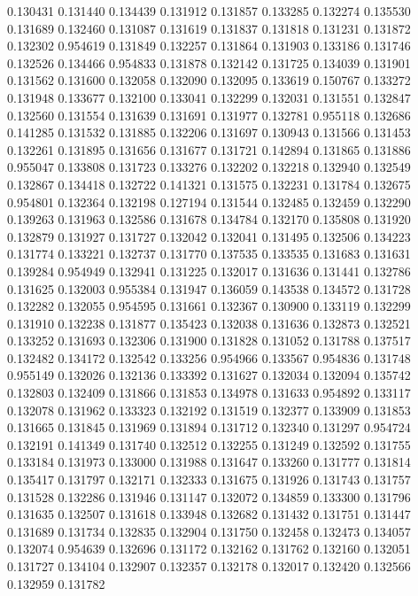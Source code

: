 0.130431
0.131440
0.134439
0.131912
0.131857
0.133285
0.132274
0.135530
0.131689
0.132460
0.131087
0.131619
0.131837
0.131818
0.131231
0.131872
0.132302
0.954619
0.131849
0.132257
0.131864
0.131903
0.133186
0.131746
0.132526
0.134466
0.954833
0.131878
0.132142
0.131725
0.134039
0.131901
0.131562
0.131600
0.132058
0.132090
0.132095
0.133619
0.150767
0.133272
0.131948
0.133677
0.132100
0.133041
0.132299
0.132031
0.131551
0.132847
0.132560
0.131554
0.131639
0.131691
0.131977
0.132781
0.955118
0.132686
0.141285
0.131532
0.131885
0.132206
0.131697
0.130943
0.131566
0.131453
0.132261
0.131895
0.131656
0.131677
0.131721
0.142894
0.131865
0.131886
0.955047
0.133808
0.131723
0.133276
0.132202
0.132218
0.132940
0.132549
0.132867
0.134418
0.132722
0.141321
0.131575
0.132231
0.131784
0.132675
0.954801
0.132364
0.132198
0.127194
0.131544
0.132485
0.132459
0.132290
0.139263
0.131963
0.132586
0.131678
0.134784
0.132170
0.135808
0.131920
0.132879
0.131927
0.131727
0.132042
0.132041
0.131495
0.132506
0.134223
0.131774
0.133221
0.132737
0.131770
0.137535
0.133535
0.131683
0.131631
0.139284
0.954949
0.132941
0.131225
0.132017
0.131636
0.131441
0.132786
0.131625
0.132003
0.955384
0.131947
0.136059
0.143538
0.134572
0.131728
0.132282
0.132055
0.954595
0.131661
0.132367
0.130900
0.133119
0.132299
0.131910
0.132238
0.131877
0.135423
0.132038
0.131636
0.132873
0.132521
0.133252
0.131693
0.132306
0.131900
0.131828
0.131052
0.131788
0.137517
0.132482
0.134172
0.132542
0.133256
0.954966
0.133567
0.954836
0.131748
0.955149
0.132026
0.132136
0.133392
0.131627
0.132034
0.132094
0.135742
0.132803
0.132409
0.131866
0.131853
0.134978
0.131633
0.954892
0.133117
0.132078
0.131962
0.133323
0.132192
0.131519
0.132377
0.133909
0.131853
0.131665
0.131845
0.131969
0.131894
0.131712
0.132340
0.131297
0.954724
0.132191
0.141349
0.131740
0.132512
0.132255
0.131249
0.132592
0.131755
0.133184
0.131973
0.133000
0.131988
0.131647
0.133260
0.131777
0.131814
0.135417
0.131797
0.132171
0.132333
0.131675
0.131926
0.131743
0.131757
0.131528
0.132286
0.131946
0.131147
0.132072
0.134859
0.133300
0.131796
0.131635
0.132507
0.131618
0.133948
0.132682
0.131432
0.131751
0.131447
0.131689
0.131734
0.132835
0.132904
0.131750
0.132458
0.132473
0.134057
0.132074
0.954639
0.132696
0.131172
0.132162
0.131762
0.132160
0.132051
0.131727
0.134104
0.132907
0.132357
0.132178
0.132017
0.132420
0.132566
0.132959
0.131782
